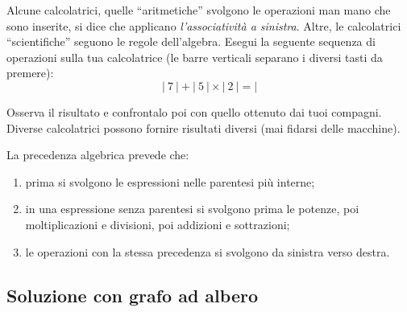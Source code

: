 
\begin{osservazione}{}{} 
Alcune calcolatrici, quelle ``aritmetiche'' svolgono le 
operazioni man mano che sono inserite, si dice che applicano 
\emph{l'associatività a sinistra}. Altre, le calcolatrici ``scientifiche'' 
seguono le regole dell'algebra. Esegui la seguente sequenza di operazioni 
sulla tua calcolatrice 
(le barre verticali separano i diversi tasti da premere):
\[|~7~|+|~5~|\times|~2~|=|\]
\end{osservazione}

Osserva il risultato e confrontalo poi con quello ottenuto dai tuoi 
compagni. 
Diverse calcolatrici possono fornire risultati diversi (mai fidarsi delle
macchine).

La precedenza algebrica prevede che:

\begin{enumerate} [nosep]
 \item prima si svolgono le espressioni nelle parentesi più interne; 
 \item in una espressione senza parentesi si svolgono prima le potenze, 
  poi moltiplicazioni e divisioni, poi addizioni e sottrazioni;
 \item le operazioni con la stessa precedenza si svolgono da sinistra verso 
  destra.
\end{enumerate}

\subsection{Soluzione con grafo ad albero}

